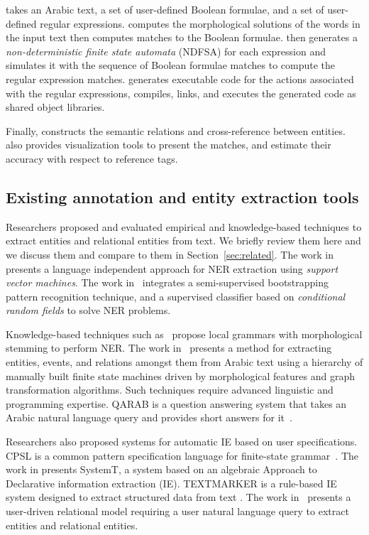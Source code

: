 \framework takes an Arabic text, a set of user-defined \framework Boolean 
formulae, and a set of user-defined \framework regular expressions. 
\framework computes the morphological solutions of the words in the 
input text then computes matches to the Boolean formulae. 
\framework then generates a {\em non-deterministic finite state 
automata} (NDFSA) for each expression and simulates it with the 
sequence of Boolean formulae matches to compute the regular 
expression matches. 
\framework generates executable code for the actions associated with
the regular expressions, 
compiles, links, and executes the generated code 
as shared object libraries. 

Finally, \framework constructs the semantic relations and 
cross-reference between entities. 
\framework also provides visualization tools to present the matches, 
and estimate their accuracy with respect to reference tags.

\subsection*{Existing annotation and entity extraction tools}

Researchers proposed and evaluated empirical and 
knowledge-based techniques to extract entities and relational entities
from text. 
We briefly review them here and we discuss them and compare to them
in Section~\ref{sec:related}. 
The work in~\cite{ekbal2010named} presents a language independent 
approach for NER extraction using {\em support vector machines}. 
The work in~\cite{abdelrahman2010integrated} integrates 
a semi-supervised bootstrapping pattern recognition technique, 
and a supervised classifier based on {\em conditional random fields}
to solve NER problems. 

Knowledge-based techniques such 
as~\cite{zaghouani2010adapting,traboulsi2009arabic} propose local grammars 
with morphological stemming to perform NER. 
The work in~\cite{ZaMaHaCicling2012Entity} presents a method for extracting entities, 
events, and relations amongst them from Arabic text using a hierarchy of manually built 
finite state machines driven by morphological features and graph 
transformation algorithms. 
Such techniques require advanced linguistic and programming expertise. 
QARAB is a question answering system that takes 
an Arabic natural language query and provides short answers for it~\cite{hammo2002qarab}. 

Researchers also proposed systems for automatic IE based 
on user specifications. 
CPSL is a common pattern specification language for finite-state 
grammar~\cite{appelt1998common}. 
The work in \cite{chiticariu2010systemt} presents SystemT, a system based on 
an algebraic Approach to Declarative information extraction (IE). 
TEXTMARKER is a rule-based IE system designed to extract structured data from 
text \cite{atzmueller2008rule}. 
The work in~\cite{urbain2012user} presents a user-driven relational model 
requiring a user natural language query to extract entities and relational entities.

